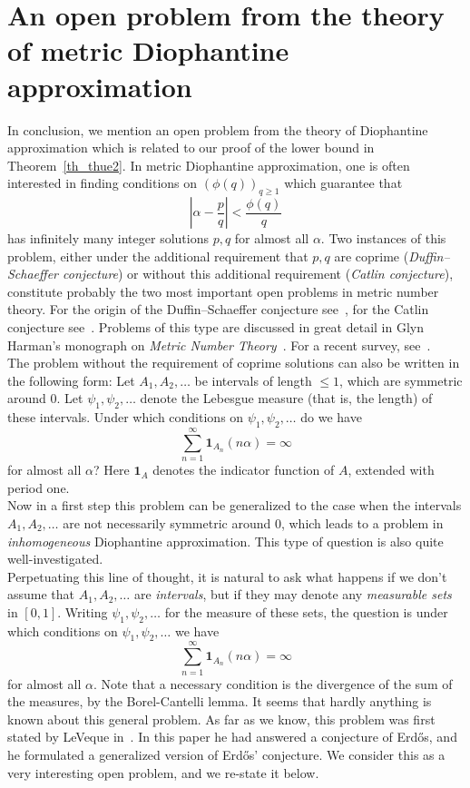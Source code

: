 \documentclass[12pt]{amsart}
\begin{document}
\section{An open problem from the theory of metric Diophantine approximation} \label{sec_conc}

In conclusion, we mention an open problem from the theory of Diophantine approximation which is related to our proof of the lower bound in Theorem~\ref{th_thue2}. In metric Diophantine approximation, one is often interested in finding conditions on $(\phi(q))_{q \geq 1}$ which guarantee that 
$$
\left|\alpha - \frac{p}{q}\right| < \frac{\phi(q)}{q}
$$
has infinitely many integer solutions $p,q$ for almost all $\alpha$. Two instances of this problem, either under the additional requirement that $p,q$ are coprime (\emph{Duffin--Schaeffer conjecture}) or without this additional requirement (\emph{Catlin conjecture}), constitute probably the two most important open problems in metric number theory. For the origin of the Duffin--Schaeffer conjecture see~\cite{duff}, for the Catlin conjecture see~\cite{catlin}. Problems of this type are discussed in great detail in Glyn Harman's monograph on \emph{Metric Number Theory}~\cite{harman}. For a recent survey, see~\cite{ber}.\\


The problem without the requirement of coprime solutions can also be written in the following form: Let $A_1, A_2, \dots$ be intervals of length $\leq 1$, which are symmetric around 0. Let $\psi_1, \psi_2, \dots$ denote the Lebesgue measure (that is, the length) of these intervals. Under which conditions on $\psi_1, \psi_2, \dots$ do we have
$$
\sum_{n=1}^\infty \mathbf{1}_{A_n} (n \alpha) = \infty
$$
for almost all $\alpha$? Here $\mathbf{1}_A$ denotes the indicator function of $A$, extended with period one.\\

Now in a first step this problem can be generalized to the case when the intervals $A_1, A_2, \dots$ are not necessarily symmetric around $0$, which leads to a problem in \emph{inhomogeneous} Diophantine approximation. This type of question is also quite well-investigated.\\

Perpetuating this line of thought, it is natural to ask what happens if we don't assume that $A_1, A_2, \dots$ are \emph{intervals}, but if they may denote any \emph{measurable sets} in $[0,1]$. Writing $\psi_1, \psi_2, \dots$ for the measure of these sets, the question is under which conditions on $\psi_1, \psi_2, \dots$ we have
$$
\sum_{n=1}^\infty \mathbf{1}_{A_n} (n \alpha) = \infty
$$
for almost all $\alpha$. Note that a necessary condition is the divergence of the sum of the measures, by the Borel-Cantelli lemma. It seems that hardly anything is known about this general problem.  As far as we know, this problem was first stated by LeVeque in~\cite{LeVe}. In this paper he had answered a conjecture of Erd\H{o}s, and he formulated a generalized version of Erd\H{o}s' conjecture. We consider this as a very interesting open problem, and we re-state it below.\\
\end{document}

